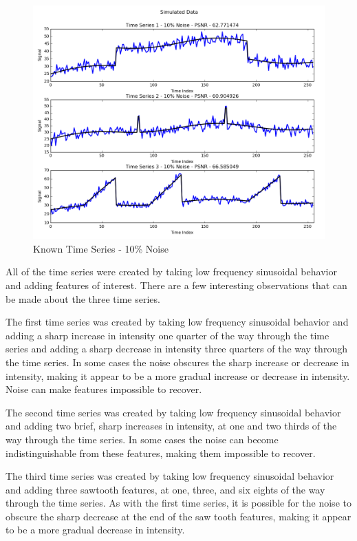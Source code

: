 \documentclass[11pt]{article}
\theoremstyle{definition}
\begin{document}
\begin{figure}[h!]
\centering
\includegraphics[width = 0.65 \textwidth]{SignalsCompare.png}
\caption{Known Time Series - 10\% Noise}
\label{signalscompare}
\end{figure}

All of the time series were created by taking low frequency sinusoidal
behavior and adding features of interest. There are a few interesting
observations that can be made about the three time series.

The first time series was created by taking low frequency sinusoidal
behavior and adding a sharp increase in intensity one quarter of the
way through the time series and adding a sharp decrease in intensity
three quarters of the way through the time series. In some cases the
noise obscures the sharp increase or decrease in intensity, making it
appear to be a more gradual increase or decrease in intensity. Noise
can make features impossible to recover. 

The second time series was created by taking low frequency sinusoidal
behavior and adding two brief, sharp increases in intensity, at one
and two thirds of the way through the time series. In some cases the
noise can become indistinguishable from these features, making them
impossible to recover.

The third time series was created by taking low frequency sinusoidal
behavior and adding three sawtooth features, at one, three, and six
eights of the way through the time series. As with the first time
series, it is possible for the noise to obscure the sharp decrease at
the end of the saw tooth features, making it appear to be a more
gradual decrease in intensity.
\end{document}
